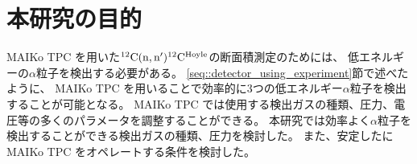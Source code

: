 \documentclass[../master]{subfiles}
\begin{document}

\section{本研究の目的}
MAIKo TPC を用いた${}^{12}{\rm C}({\rm n},{\rm n}'){}^{12}{\rm C}^{\rm Hoyle}$の断面積測定のためには、
低エネルギーの$\alpha$粒子を検出する必要がある。
\ref{seq::detector_using_experiment}節で述べたように、
MAIKo TPC を用いることで効率的に3つの低エネルギー$\alpha$粒子を検出することが可能となる。
MAIKo TPC では使用する検出ガスの種類、圧力、電圧等の多くのパラメータを調整することができる。
本研究では効率よく$\alpha$粒子を検出することができる検出ガスの種類、圧力を検討した。
また、安定したにMAIKo TPC をオペレートする条件を検討した。
\end{document}
